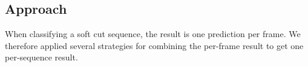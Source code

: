 \subsection{Approach}
\label{sec:soft_cut_approach}



When classifying a soft cut sequence, the result is one prediction per frame.
We therefore applied several strategies for combining the per-frame result to get one per-sequence result.
